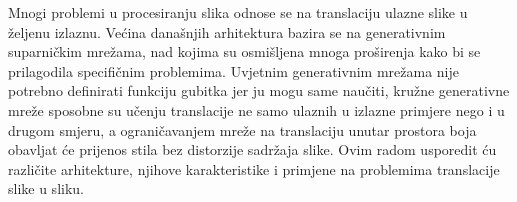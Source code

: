 \documentclass[lmodern, utf8, seminar]{fer}
\begin{document}




\begin{sazetak}
Mnogi problemi u procesiranju slika odnose se na translaciju ulazne slike u željenu izlaznu. Većina današnjih arhitektura bazira se na generativnim suparničkim mrežama, nad kojima su osmišljena mnoga proširenja kako bi se prilagodila specifičnim problemima. Uvjetnim generativnim mrežama nije potrebno definirati funkciju gubitka jer ju mogu same naučiti, kružne generativne mreže sposobne su učenju translacije ne samo ulaznih u izlazne primjere nego i u drugom smjeru, a ograničavanjem mreže na translaciju unutar prostora boja obavljat će prijenos stila bez distorzije sadržaja slike. Ovim radom usporedit ću različite arhitekture, njihove karakteristike i primjene na problemima translacije slike u sliku.

\end{sazetak}

\begin{abstract}

\end{abstract}
\end{document}

